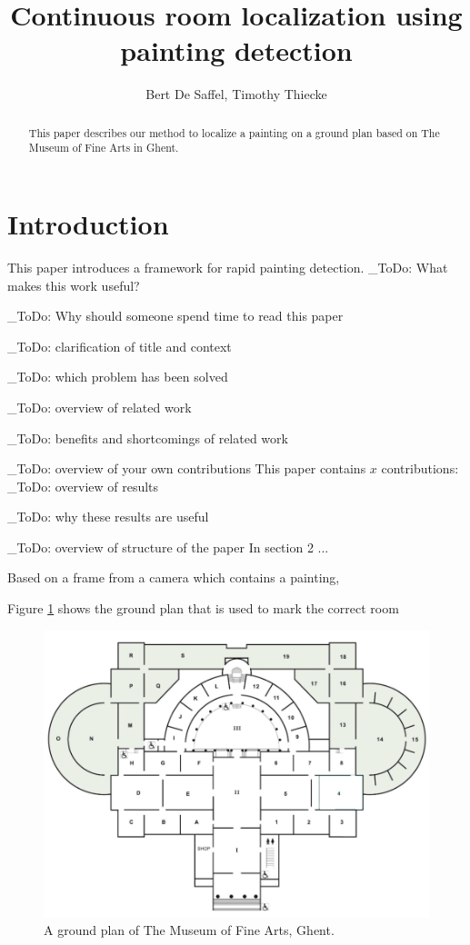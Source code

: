 \documentclass[10pt,final,journal]{IEEEtran}
\title{Continuous room localization using painting detection}
\author{Bert De Saffel, Timothy Thiecke}
\newcommand{\todo}[1]{\color{red}\_ToDo: #1 \color{black}}
\begin{document}
	\maketitle
	\begin{abstract}
		
		This paper describes our method to localize a painting on a ground plan based on The Museum of Fine Arts in Ghent. 
	\end{abstract}


	\section{Introduction}
	This paper introduces a framework for rapid painting detection.
	\todo{What makes this work useful?}
	
	\todo{Why should someone spend time to read this paper}
	
	\todo{clarification of title and context}
	
	\todo{which problem has been solved}
	
	\todo{overview of related work}
	
	\todo{benefits and shortcomings of related work}
	
	\todo{overview of your own contributions}
	This paper contains $x$ contributions:
	\todo{overview of results}
	
	\todo{why these results are useful}
	
	\todo{overview of structure of the paper}
	In section 2 ...

	
	Based on a frame from a camera which contains a painting, 
	
	Figure \ref{fig:groundplan_msk} shows the ground plan that is used to mark the correct room
	
	\begin{figure}
		\includegraphics[width=\linewidth]{groundplan_msk}
		\caption{A ground plan of The Museum of Fine Arts, Ghent. }
		\label{fig:groundplan_msk}
	\end{figure}
\end{document}
